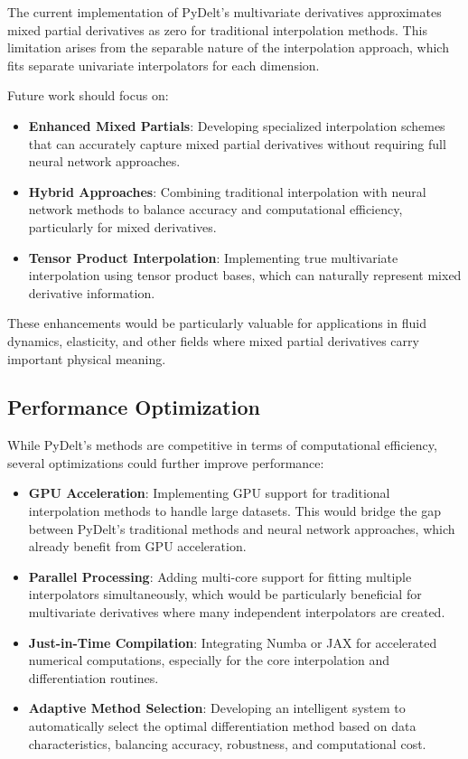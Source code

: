 \documentclass[11pt,a4paper]{article}
\begin{document}
The current implementation of PyDelt's multivariate derivatives approximates mixed partial derivatives as zero for traditional interpolation methods. This limitation arises from the separable nature of the interpolation approach, which fits separate univariate interpolators for each dimension.

Future work should focus on:

\begin{itemize}
    \item \textbf{Enhanced Mixed Partials}: Developing specialized interpolation schemes that can accurately capture mixed partial derivatives without requiring full neural network approaches.
    
    \item \textbf{Hybrid Approaches}: Combining traditional interpolation with neural network methods to balance accuracy and computational efficiency, particularly for mixed derivatives.
    
    \item \textbf{Tensor Product Interpolation}: Implementing true multivariate interpolation using tensor product bases, which can naturally represent mixed derivative information.
\end{itemize}

These enhancements would be particularly valuable for applications in fluid dynamics, elasticity, and other fields where mixed partial derivatives carry important physical meaning.

\subsection{Performance Optimization}

While PyDelt's methods are competitive in terms of computational efficiency, several optimizations could further improve performance:

\begin{itemize}
    \item \textbf{GPU Acceleration}: Implementing GPU support for traditional interpolation methods to handle large datasets. This would bridge the gap between PyDelt's traditional methods and neural network approaches, which already benefit from GPU acceleration.
    
    \item \textbf{Parallel Processing}: Adding multi-core support for fitting multiple interpolators simultaneously, which would be particularly beneficial for multivariate derivatives where many independent interpolators are created.
    
    \item \textbf{Just-in-Time Compilation}: Integrating Numba or JAX for accelerated numerical computations, especially for the core interpolation and differentiation routines.
    
    \item \textbf{Adaptive Method Selection}: Developing an intelligent system to automatically select the optimal differentiation method based on data characteristics, balancing accuracy, robustness, and computational cost.
\end{itemize}
\end{document}

